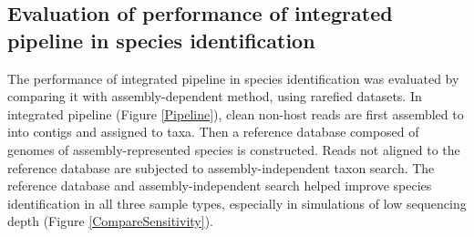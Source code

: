 \documentclass[11pt]{article}
\begin{document}
    \subsection{Evaluation of performance of integrated pipeline in species identification}
    The performance of integrated pipeline in species identification was evaluated by comparing it with assembly-dependent method, using rarefied datasets. 
    In integrated pipeline (Figure \ref{Pipeline}), clean non-host reads are first assembled to into contigs and assigned to taxa. 
    Then a reference database composed of genomes of assembly-represented species is constructed. 
    Reads not aligned to the reference database are subjected to assembly-independent taxon search. 
    The reference database and assembly-independent search helped improve species identification in all three sample types, especially in simulations of low sequencing depth (Figure \ref{CompareSensitivity}).
\end{document}
